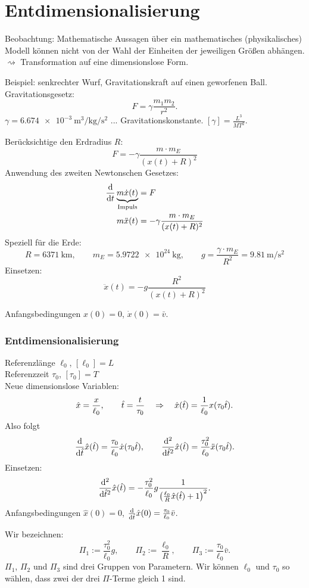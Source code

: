 \section{Entdimensionalisierung}
Beobachtung:  Mathematische Aussagen über ein mathematisches (physikalisches)
Modell können nicht von der Wahl der Einheiten der jeweiligen Größen abhängen.
$\rightsquigarrow$ Transformation auf eine dimensionslose Form.

Beispiel: senkrechter Wurf, Gravitationskraft auf einen geworfenen Ball.
Gravitationsgesetz: 
\[ F = \gamma \frac{ m_1 m_2 }{ r^2 }. \]
$\gamma = \SI{6.674e-3}{\m \cubed \per \kg \per \s \squared}$ ...
Gravitationskonstante. $[\gamma] = \frac{L^3}{MT^2}$.

Berücksichtige den Erdradius $R$:
\[ F = - \gamma \frac{ m \cdot m_E }{ (x(t) + R)^2 } \]
Anwendung des zweiten Newtonschen Gesetzes:
\begin{align*}
  \frac{\mathrm{d} }{\mathrm{d} t} \underbrace{m \dot{x}(t)}_{\text{Impuls}} &= F \\
  m \ddot{x}(t) &= - \gamma \frac{ m \cdot m_E }{ (x(t) + R)^2 }
\end{align*}
Speziell für die Erde:
\[ R = \SI{6371}{\km}, \qquad m_E = \SI{5.9722e24}{\kg}, \qquad g = \frac{\gamma
    \cdot m_E}{R^2} = \SI{9.81}{\m \per \second \squared} \]
Einsetzen:
\[ \ddot{x}(t) = -g \frac{R^2}{(x(t) + R)^2} \]

Anfangsbedingungen $x(0) = 0$, $\dot{x}(0) = \bar{v}$.

\subsubsection*{Entdimensionalisierung}
Referenzlänge $\ell_0$, $[\ell_0] = L$ \\
Referenzzeit $\tau_0$, $[\tau_0] = T$ \\
Neue dimensionslose Variablen:
\[ \hat{x} = \frac{x}{\ell_0}, \qquad \hat{t} = \frac{t}{\tau_0} \quad \Rightarrow \quad
  \hat{x}(\hat{t}) = \frac{1}{\ell_0} x ( \tau_0 \hat{t} ). \]
Also folgt
\[ \frac{\mathrm{d} }{\mathrm{d} \hat{t}} \hat{x}(\hat{t})
  = \frac{\tau_0}{\ell_0} \dot{x}(\tau_0 \hat{t}), \qquad
  \frac{\mathrm{d}^2}{\mathrm{d} \hat{t}^2} \hat{x}(\hat{t}) = \frac{\tau_0^2}{\ell_0}
  \ddot{x}( \tau_0 \hat{t}). \]
Einsetzen:
\[ \frac{\mathrm{d}^2}{\mathrm{d} \hat{t}^2} \hat{x}(\hat{t}) =
  - \frac{\tau_0^2}{\ell_0} g \frac{1}{\left( \frac{\ell_0}{R} \hat{x}(\hat{t}) + 1
    \right)^2}. \]
Anfangsbedingungen $\hat{x}(0) = 0$, $\frac{\mathrm{d} }{\mathrm{d} \hat{t}}\hat{x}(0) =
\frac{\tau_0}{\ell_0} \bar{v}$.

Wir bezeichnen:
\[ \Pi_1 := \frac{\tau_0^2}{\ell_0} g, \qquad
  \Pi_2 := \frac{\ell_0}{R}, \qquad
  \Pi_3 := \frac{\tau_0}{\ell_0} \bar{v}. \]
$\Pi_1$, $\Pi_2$ und $\Pi_3$ sind drei Gruppen von Parametern. Wir können
$\ell_0$ und $\tau_0$ so wählen, dass zwei der drei $\Pi$-Terme gleich 1 sind.

